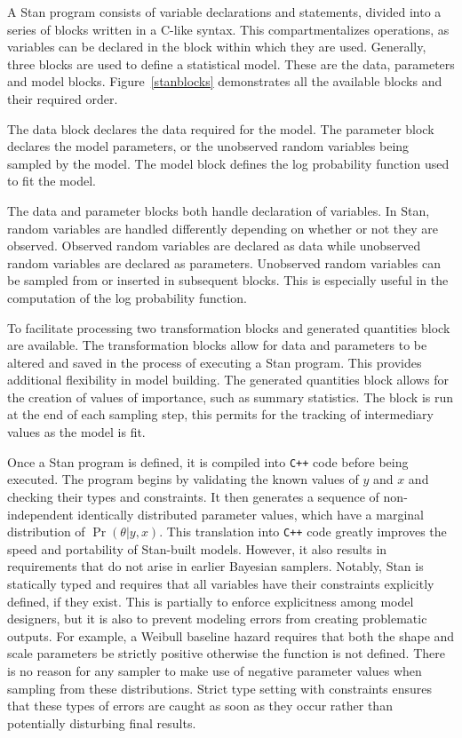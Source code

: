 A Stan program consists of variable declarations and statements, divided into a series of blocks written in a C-like syntax. This compartmentalizes operations, as variables can be declared in the block within which they are used. Generally, three blocks are used to define a statistical model. These are the data, parameters and model blocks. Figure~\ref{stanblocks} demonstrates all the available blocks and their required order.

The data block declares the data required for the model. The parameter block declares the model parameters, or the unobserved random variables being sampled by the model. The model block defines the log probability function used to fit the model. 

The data and parameter blocks both handle declaration of variables. In Stan, random variables are handled differently depending on whether or not they are observed. Observed random variables are declared as data while unobserved random variables are declared as parameters. Unobserved random variables can be sampled from or inserted in subsequent blocks. This is especially useful in the computation of the log probability function. 

To facilitate processing two transformation blocks and generated quantities block are available. The transformation blocks allow for data and parameters to be altered and saved in the process of executing a Stan program. This provides additional flexibility in model building. The generated quantities block allows for the creation of values of importance, such as summary statistics. The block is run at the end of each sampling step, this permits for the tracking of intermediary values as the model is fit. 

Once a Stan program is defined, it is compiled into \lstinline{C++} code before being executed. The program begins by validating the known values of $y$ and $x$ and checking their types and constraints. It then generates a sequence of non-independent identically distributed parameter values, which have a marginal distribution of $\Pr(\theta|y,x)$. This translation into \lstinline{C++} code greatly improves the speed and portability of Stan-built models. However, it also results in requirements that do not arise in earlier Bayesian samplers. Notably, Stan is statically typed and requires that all variables have their constraints explicitly defined, if they exist. This is partially to enforce explicitness among model designers, but it is also to prevent modeling errors from creating problematic outputs. For example, a Weibull baseline hazard requires that both the shape and scale parameters be strictly positive otherwise the function is not defined. There is no reason for any sampler to make use of negative parameter values when sampling from these distributions. Strict type setting with constraints ensures that these types of errors are caught as soon as they occur rather than potentially disturbing final results. 

